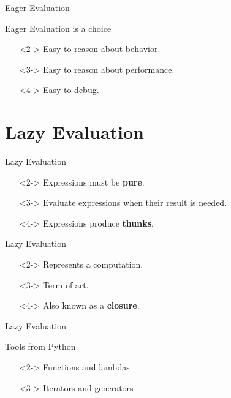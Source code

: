 \documentclass{beamer}
\begin{document}
\begin{frame}{Eager Evaluation}
  \begin{block}{Eager Evaluation is a choice}
    \begin{itemize}
    \item[]<2-> Easy to reason about behavior.
    \item[]<3-> Easy to reason about performance.
    \item[]<4-> Easy to debug.
    \end{itemize}
  \end{block}
\end{frame}

\section{Lazy Evaluation}

\begin{frame}{Lazy Evaluation}
  \begin{definition}
    \begin{itemize}
    \item[]<2-> Expressions must be \textbf{pure}.
    \item[]<3-> Evaluate expressions when their result is needed.
    \item[]<4-> Expressions produce \textbf{thunks}.
    \end{itemize}
  \end{definition}
\end{frame}

\begin{frame}{Lazy Evaluation}
  \begin{definition}[Thunk]
    \begin{itemize}
    \item[]<2-> Represents a computation.
    \item[]<3-> Term of art.
    \item[]<4-> Also known as a \textbf{closure}.
    \end{itemize}
  \end{definition}
\end{frame}

\begin{frame}{Lazy Evaluation}
  \begin{block}{Tools from Python}
    \begin{itemize}
      \item[]<2-> Functions and lambdas
      \item[]<3-> Iterators and generators
    \end{itemize}
  \end{block}
\end{frame}
\end{document}
